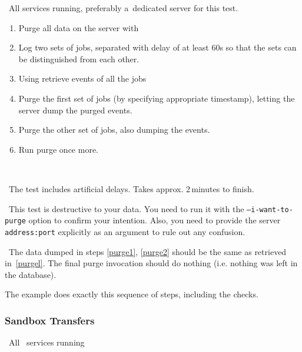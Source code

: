 \req\ All \LB services running, preferably a~dedicated server for this test.

\what
\begin{enumerate}
\item Purge all data on the server with 
\item Log two sets of jobs, separated with delay of at least 60s so
that the sets can be distinguished from each other.
\item \label{purgel}
Using  retrieve events of all the jobs
\item \label{purge1}
Purge the first set of jobs (by specifying appropriate timestamp),
letting the server dump the purged events.
\item \label{purge2} Purge the other set of jobs, also dumping the events.
\item \label{purge3} Run purge once more.
\end{enumerate}

\how\ 

\note\ The test includes artificial delays. Takes approx. 2\,minutes to finish.

\note\ This test is destructive to your data. You need to run it with the \texttt{--i-want-to-purge} option to confirm your intention. Also, you need to provide the \LB server \texttt{address:port} explicitly as an argument to rule out any confusion. 

\result\ The data dumped in steps \ref{purge1}, \ref{purge2} should be the
same as retrieved in~\ref{purgel}. The final purge invocation should
do nothing (i.e. nothing was left in the database).

\begin{hints}
The example  does exactly this sequence of steps,
including the checks.
\end{hints}

\subsubsection{Sandbox Transfers}

\req\ All \LB\ services running

